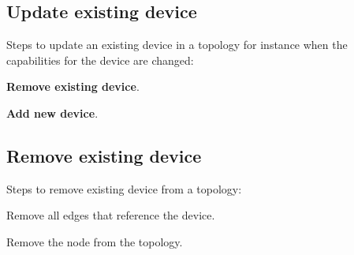 \subsection*{Update existing device}     

Steps to update an existing device in a topology for instance when the capabilities for the device are changed:
\begin{compactenum}
\item \textbf{Remove existing device}.
\item \textbf{Add new device}.
\end{compactenum} 
     
\subsection*{Remove existing device}     

Steps to remove existing device from a topology:
\begin{compactenum}
\item Remove all edges that reference the device.
\item Remove the node from the topology.
\end{compactenum}   
